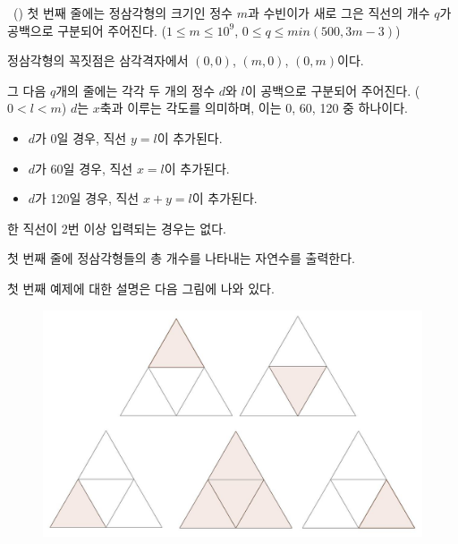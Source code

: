 \begin{problem}{\kcpcpprobtriangle\ (\kcpcpprobtriangleshort)}
    첫 번째 줄에는 정삼각형의 크기인 정수 $ m $과 수빈이가 새로 그은 직선의 개수 $ q $가 공백으로 구분되어 주어진다. ($ 1 \leq m \leq 10^9 $, $ 0 \leq q \leq min(500, 3m-3)$)
    
    정삼각형의 꼭짓점은 삼각격자에서 $ (0,0) $, $ (m,0) $, $ (0,m) $이다.
    
    그 다음 $ q $개의 줄에는 각각 두 개의 정수 $ d $와 $ l $이 공백으로 구분되어 주어진다. ($ 0 < l < m $) $ d $는 $ x $축과 이루는 각도를 의미하며, 이는 0, 60, 120 중 하나이다.
    
    \begin{itemize}
        \item $ d $가 0일 경우, 직선 $ y=l $이 추가된다.
        \item $ d $가 60일 경우, 직선 $ x=l $이 추가된다.
        \item $ d $가 120일 경우, 직선 $ x+y=l $이 추가된다. 
    \end{itemize}
    
    한 직선이 2번 이상 입력되는 경우는 없다.
    
    \OutputFile
    
    첫 번째 줄에 정삼각형들의 총 개수를 나타내는 자연수를 출력한다.
    
    \Examples
    \begin{example}
    \end{example}

    \Explanation
    첫 번째 예제에 대한 설명은 다음 그림에 나와 있다.
    \begin{figure}[h]
        \centering
        \includegraphics[height=0.25\textheight]{./problems/triangle-pic2.jpg}
    \end{figure}
    
\end{problem}

